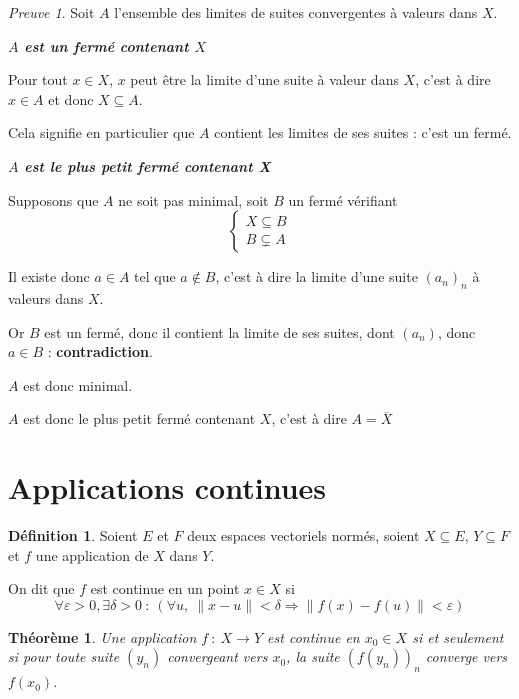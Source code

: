 \documentclass[]{article}
\newtheorem{mythm}{Théorème}
\theoremstyle{remark}
\newtheorem{myproof}{Preuve}
\theoremstyle{definition}
\newtheorem{mydef}{Définition}
\newenvironment{proofpart}[1]{
	\leavevmode
	
	\noindent
	{\textit{\textbf{\boldmath #1}}}
	
}{
	\checkmark
}
\begin{document}
\begin{myproof}
	Soit $A$ l'ensemble des limites de suites convergentes à valeurs dans $X$.
	
	
	\begin{proofpart}{$A$ est un fermé contenant $X$}
		Pour tout $x \in X$, $x$ peut être la limite d'une suite à valeur dans $X$, c'est à dire $x \in A$ et donc $X \subseteq A$.
		
		Cela signifie en particulier que $A$ contient les limites de ses suites : c'est un fermé.
	\end{proofpart}
	
	\begin{proofpart}{$A$ est le plus petit fermé contenant X}
		Supposons que $A$ ne soit pas minimal, soit $B$ un fermé vérifiant
		$$
			\left\{
			\begin{array}{l}
				X \subseteq B\\
				B \subsetneq A
			\end{array}\right.$$
		
		Il existe donc $a \in A$ tel que $a \not\in B$, c'est à dire la limite d'une suite $(a_n)_n$ à valeurs dans $X$.
		
		Or $B$ est un fermé, donc il contient la limite de ses suites, dont $(a_n)$, donc $a \in B$ : \textbf{contradiction}.
		
		$A$ est donc minimal.
	\end{proofpart}
	
	$A$ est donc le plus petit fermé contenant $X$, c'est à dire $A = \overline{X}$	
\end{myproof}

\section{Applications continues}

\begin{mydef}
	Soient $E$ et $F$ deux espaces vectoriels normés, soient $X \subseteq E$, $Y \subseteq F$ et $f$ une application de $X$ dans $Y$.
	
	On dit que $f$ est continue en un point $x \in X$ si $$\forall \varepsilon > 0, \exists \delta > 0 ~ : ~ (\forall u, ~ \|x-u\| < \delta \Longrightarrow \|f(x)-f(u)\| < \varepsilon)$$
\end{mydef}

\begin{mythm}
	Une application $f~:~X \longrightarrow Y$ est continue en $x_0 \in X$ si et seulement si pour toute suite $(y_n)$ convergeant vers $x_0$, la suite $\left(f(y_n)\right)_n$ converge vers $f(x_0)$.
\end{mythm}
\end{document}
